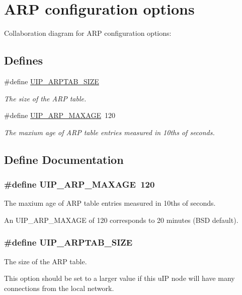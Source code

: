 \hypertarget{a00075}{
\section{ARP configuration options}
\label{a00075}
}


Collaboration diagram for ARP configuration options:

\subsection*{Defines}
\begin{CompactItemize}
\item 
\#define \hyperlink{a00075_gb1455b27c06532a399cf06d2c1d6d08d}{UIP\_\-ARPTAB\_\-SIZE}
\begin{CompactList}\small\item\em The size of the ARP table. \item\end{CompactList}\item 
\#define \hyperlink{a00075_g3090117ef3ff5775b77cb1960e442d07}{UIP\_\-ARP\_\-MAXAGE}~120
\begin{CompactList}\small\item\em The maxium age of ARP table entries measured in 10ths of seconds. \item\end{CompactList}\end{CompactItemize}


\subsection{Define Documentation}
\hypertarget{a00075_g3090117ef3ff5775b77cb1960e442d07}{
\subsubsection[UIP\_\-ARP\_\-MAXAGE]{\setlength{\rightskip}{0pt plus 5cm}\#define UIP\_\-ARP\_\-MAXAGE~120}}
\label{a00075_g3090117ef3ff5775b77cb1960e442d07}


The maxium age of ARP table entries measured in 10ths of seconds. 

An UIP\_\-ARP\_\-MAXAGE of 120 corresponds to 20 minutes (BSD default). \hypertarget{a00075_gb1455b27c06532a399cf06d2c1d6d08d}{
\subsubsection[UIP\_\-ARPTAB\_\-SIZE]{\setlength{\rightskip}{0pt plus 5cm}\#define UIP\_\-ARPTAB\_\-SIZE}}
\label{a00075_gb1455b27c06532a399cf06d2c1d6d08d}


The size of the ARP table. 

This option should be set to a larger value if this u\-IP node will have many connections from the local network. 